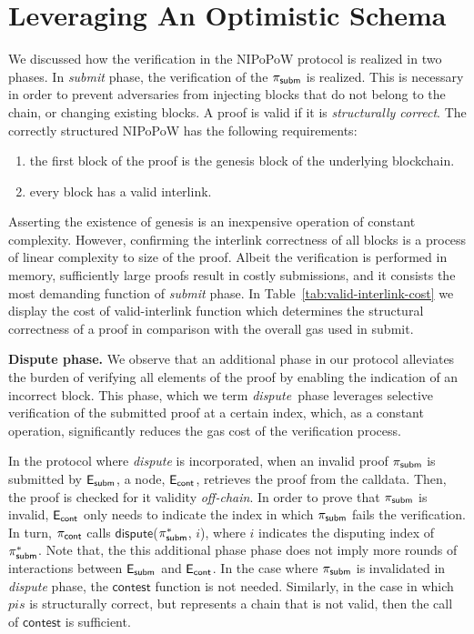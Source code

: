 \section{Leveraging An Optimistic Schema}

We discussed how the verification in the NIPoPoW protocol is realized in two
phases. In \emph{submit} phase, the verification of the $\mathsf{\pi_{subm}}$ is realized.
This is necessary in order to prevent adversaries from injecting blocks that do
not belong to the chain, or changing existing blocks. A proof is valid if it is
\emph{structurally correct}. The correctly structured NIPoPoW has the following
requirements:
\begin{enumerate}
    \item the first block of the proof is the genesis block of the underlying
        blockchain.
    \item every block has a valid interlink.
\end{enumerate}

Asserting the existence of genesis is an inexpensive operation of constant
complexity. However, confirming the interlink correctness of all blocks is a
process of linear complexity to size of the proof. Albeit the verification is
performed in memory, sufficiently large proofs result in costly submissions,
and it consists the most demanding function of \emph{submit} phase. In
Table~\ref{tab:valid-interlink-cost} we display the cost of
\textsf{valid-interlink} function which determines the structural correctness
of a proof in comparison with the overall gas used in \textsf{submit}.



\newcommand{\dispute}{\emph{dispute\ }} \noindent \textbf{Dispute phase.} We
observe that an additional phase in our protocol alleviates the burden of
verifying all elements of the proof by enabling the indication of an incorrect
block. This phase, which we term \dispute phase leverages selective
verification of the submitted proof at a certain index, which, as a constant
operation, significantly reduces the gas cost of the verification process.

In the protocol where \emph{dispute} is incorporated, when an invalid proof
$\mathsf{\pi_{subm}}$ is submitted by $\mathsf{E_{subm}}$, a node, $\mathsf{E_{cont}}$, retrieves the proof from the
calldata. Then, the proof is checked for it validity \emph{off-chain}. In order
to prove that $\mathsf{\pi_{subm}}$ is invalid, $\mathsf{E_{cont}}$ only needs to indicate the index in
which $\mathsf{\pi_{subm}}$ fails the verification. In turn, $\mathsf{\pi_{cont}}$ calls
$\textsf{dispute}$($\mathsf{\pi_{subm}^*}$, $i$), where $i$ indicates the disputing index of
$\mathsf{\pi_{subm}^*}$. Note that, the this additional phase phase does not imply more rounds
of interactions between $\mathsf{E_{subm}}$ and $\mathsf{E_{cont}}$. In the case where $\mathsf{\pi_{subm}}$ is
invalidated in \emph{dispute} phase, the $\textsf{contest}$ function is not
needed. Similarly, in the case in which $pis$ is structurally correct, but
represents a chain that is not valid, then the call of $\textsf{contest}$ is
sufficient.

